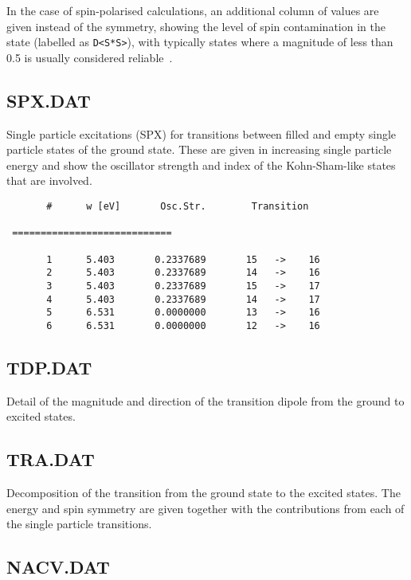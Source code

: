 In the case of spin-polarised calculations, an additional column of values are
given instead of the symmetry, showing the level of spin contamination in the
state (labelled as \verb|D<S*S>|), with typically states where a magnitude of
less than 0.5 is usually considered reliable~\cite{garcia14Thesis}.

\subsection{SPX.DAT}

Single particle excitations (SPX) for transitions between filled and empty single
particle states of the ground state. These are given in increasing single
particle energy and show the oscillator strength and index of the Kohn-Sham-like
states that are involved.

\begin{verbatim}
       #      w [eV]       Osc.Str.        Transition

 ============================

       1      5.403       0.2337689       15   ->    16
       2      5.403       0.2337689       14   ->    16
       3      5.403       0.2337689       15   ->    17
       4      5.403       0.2337689       14   ->    17
       5      6.531       0.0000000       13   ->    16
       6      6.531       0.0000000       12   ->    16
\end{verbatim}

\subsection{TDP.DAT}

Detail of the magnitude and direction of the transition dipole from the ground
to excited states.

\subsection{TRA.DAT}

Decomposition of the transition from the ground state to the excited states. The
energy and spin symmetry are given together with the contributions from each of
the single particle transitions.

\subsection{NACV.DAT}
\label{subsec:nacv.dat}

